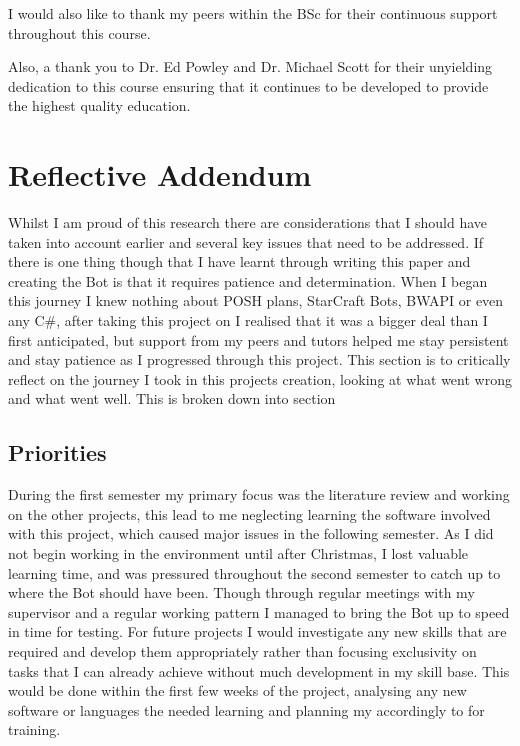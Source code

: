 \documentclass[journal]{IEEEtran}
\begin{document}
	I would also like to thank my peers within the BSc for their continuous support throughout this course.
	
	Also, a thank you to Dr. Ed Powley and Dr. Michael Scott for their unyielding dedication to this course ensuring that it continues to be developed to provide the highest quality education.
	
	\section{Reflective Addendum}
	Whilst I am proud of this research there are considerations that I should have taken into account earlier and several key issues that need to be addressed. If there is one thing though that I have learnt through writing this paper and creating the Bot is that it requires patience and determination. When I began this journey I knew nothing about POSH plans, StarCraft Bots, BWAPI or even any C\#, after taking this project on I realised that it was a bigger deal than I first anticipated, but support from my peers and tutors helped me stay persistent and stay patience as I progressed through this project. This section is to critically reflect on the journey I took in this projects creation, looking at what went wrong and what went well. This is broken down into section 
	
	\subsection{Priorities}
	During the first semester my primary focus was the literature review and working on the other projects, this lead to me neglecting learning the software involved with this project, which caused major issues in the following semester. As I did not begin working in the environment until after Christmas, I lost valuable learning time, and was pressured throughout the second semester to catch up to where the Bot should have been. Though through regular meetings with my supervisor and a regular working pattern I managed to bring the Bot up to speed in time for testing. For future projects I would investigate any new skills that are required and develop them appropriately rather than focusing exclusivity on tasks that I can already achieve without much development in my skill base. This would be done within the first few weeks of the project, analysing any new software or languages the needed learning and planning my accordingly to for training.
	
\end{document}
